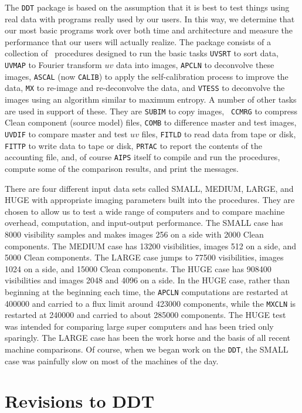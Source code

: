 The {\tt DDT} package is based on the assumption that it is best to
test things using real data with programs really used by our users.
In this way, we determine that our most basic programs work over both
time and architecture and measure the performance that our users will
actually realize.  The package consists of a collection of \AIPS\
procedures designed to run the basic tasks {\tt UVSRT} to sort data,
{\tt UVMAP} to Fourier transform $uv$ data into images, {\tt APCLN} to
deconvolve these images, {\tt ASCAL} (now {\tt CALIB}) to apply the
self-calibration process to improve the data, {\tt MX} to re-image and
re-deconvolve the data, and {\tt VTESS} to deconvolve the images using
an algorithm similar to maximum entropy.  A number of other tasks are
used in support of these.  They are {\tt SUBIM} to copy images, {\tt
CCMRG} to compress Clean component (source model) files, {\tt COMB}
to difference master and test images, {\tt UVDIF} to compare master
and test $uv$ files, {\tt FITLD} to read data from tape or disk, {\tt
FITTP} to write data to tape or disk, {\tt PRTAC} to report the
contents of the accounting file, and, of course {\tt AIPS} itself to
compile and run the procedures, compute some of the comparison
results, and print the messages.

There are four different input data sets called SMALL, MEDIUM, LARGE,
and HUGE with appropriate imaging parameters built into the
procedures.  They are chosen to allow us to test a wide range of
computers and to compare machine overhead, computation, and
input-output performance.  The SMALL case has 8000 visibility samples
and makes images 256 on a side with 2000 Clean components.  The MEDIUM
case has 13200 visibilities, images 512 on a side, and 5000 Clean
components.  The LARGE case jumps to 77500 visibilities, images 1024
on a side, and 15000 Clean components.  The HUGE case has 908400
visibilities and images 2048 and 4096 on a side.  In the HUGE case,
rather than beginning at the beginning each time, the {\tt APCLN}
computations are restarted at 400000 and carried to a flux limit
around 423000 components, while the {\tt MXCLN} is restarted at 240000
and carried to about 285000 components.  The HUGE test was intended
for comparing large super computers and has been tried only sparingly.
The LARGE case has been the work horse and the basis of all recent
machine comparisons.  Of course, when we began work on the {\tt DDT},
the SMALL case was painfully slow on most of the machines of the day.

\section{Revisions to DDT}

